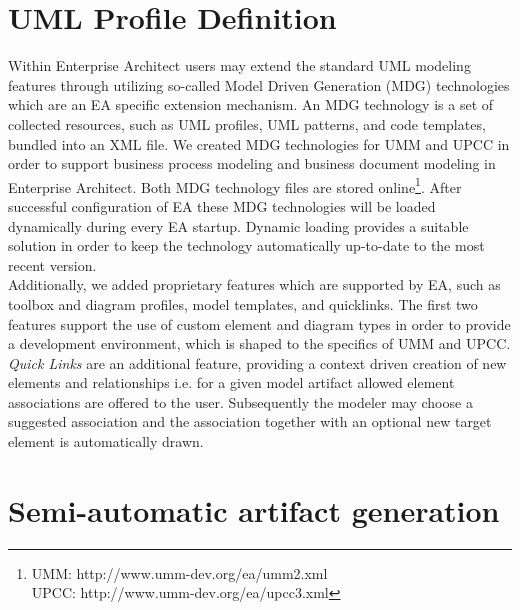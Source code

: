 \documentclass{acm_proc_article-sp}
\begin{document}
\section{UML Profile Definition}
Within Enterprise Architect users may extend the standard UML modeling features through utilizing so-called Model Driven Generation (MDG) technologies which are an EA specific extension mechanism. An MDG technology is a set of collected resources, such as UML profiles, UML patterns, and code templates, bundled into an XML file. We created MDG technologies for UMM and UPCC in order to support business process modeling and business document modeling in Enterprise Architect. Both MDG technology files are stored online\footnote{UMM: http://www.umm-dev.org/ea/umm2.xml\\UPCC:\; http://www.umm-dev.org/ea/upcc3.xml}. After successful configuration of EA these MDG technologies will be loaded dynamically during every EA startup. Dynamic loading provides a suitable solution in order to keep the technology automatically up-to-date to the most recent version. \\Additionally, we added proprietary features which are supported by EA, such as toolbox and diagram profiles, model templates, and quicklinks. The first two features support the use of custom element and diagram types in order to provide a development environment, which is shaped to the specifics of UMM and UPCC. \textit{Quick Links} are an additional feature, providing a context driven creation of new elements and relationships i.e. for a given model artifact allowed element associations are offered to the user. Subsequently the modeler may choose a suggested association and the association together with an optional new target element is automatically drawn.

\section{Semi-automatic artifact generation}
\end{document}
